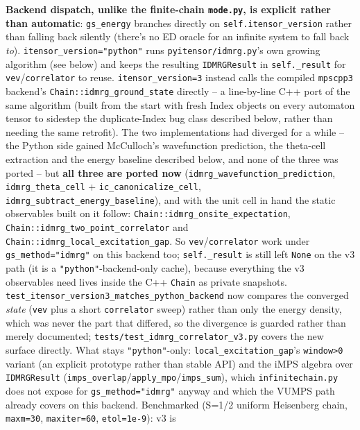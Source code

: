 \documentclass[11pt]{article}
\begin{document}
\textbf{Backend dispatch, unlike the finite-chain \texttt{mode.py}, is
explicit rather than automatic}: \texttt{gs\_energy} branches directly on
\texttt{self.itensor\_version} rather than falling back silently (there's
no ED oracle for an infinite system to fall back \emph{to}).
\texttt{itensor\_version="python"} runs \texttt{pyitensor/idmrg.py}'s own
growing algorithm (see below) and keeps the resulting
\texttt{IDMRGResult} in \texttt{self.\_result} for
\texttt{vev}/\texttt{correlator} to reuse. \texttt{itensor\_version=3}
instead calls the compiled \texttt{mpscpp3} backend's
\texttt{Chain::idmrg\_ground\_state} directly -- a line-by-line C++ port
of the same algorithm (built from the start with fresh Index objects on
every automaton tensor to sidestep the duplicate-Index bug class
described below, rather than needing the same retrofit). The two
implementations had diverged for a while -- the Python side gained
McCulloch's wavefunction prediction, the theta-cell extraction and the
energy baseline described below, and none of the three was ported -- but
\textbf{all three are ported now}
(\texttt{idmrg\_wavefunction\_prediction}, \texttt{idmrg\_theta\_cell} +
\texttt{ic\_canonicalize\_cell},
\texttt{idmrg\_subtract\_energy\_baseline}), and with the unit cell in
hand the static observables built on it follow:
\texttt{Chain::idmrg\_onsite\_expectation},
\texttt{Chain::idmrg\_two\_point\_correlator} and
\texttt{Chain::idmrg\_local\_excitation\_gap}. So
\texttt{vev}/\texttt{correlator} work under \texttt{gs\_method="idmrg"} on
this backend too; \texttt{self.\_result} is still left \texttt{None} on
the v3 path (it is a \texttt{"python"}-backend-only cache), because
everything the v3 observables need lives inside the C++ \texttt{Chain} as
private snapshots. \texttt{test\_itensor\_version3\_matches\_python\_backend}
now compares the converged \emph{state} (\texttt{vev} plus a short
\texttt{correlator} sweep) rather than only the energy density, which was
never the part that differed, so the divergence is guarded rather than
merely documented;
\texttt{tests/test\_idmrg\_correlator\_v3.py} covers the new surface
directly. What stays \texttt{"python"}-only:
\texttt{local\_excitation\_gap}'s \texttt{window>0} variant (an explicit
prototype rather than stable API) and the iMPS algebra over
\texttt{IDMRGResult}
(\texttt{imps\_overlap}/\texttt{apply\_mpo}/\texttt{imps\_sum}), which
\texttt{infinitechain.py} does not expose for \texttt{gs\_method="idmrg"}
anyway and which the VUMPS path already covers on this backend.
Benchmarked (S=1/2 uniform Heisenberg chain,
\texttt{maxm=30}, \texttt{maxiter=60}, \texttt{etol=1e-9}): v3 is
\end{document}
